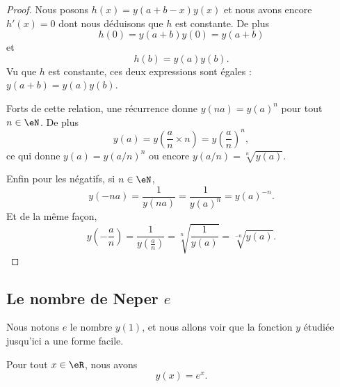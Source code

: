 \begin{proof}
    Nous posons \( h(x)=y(a+b-x)y(x)\) et nous avons encore \( h'(x)=0\) dont nous déduisons que $h$ est constante. De plus
    \begin{equation}
        h(0)=y(a+b)y(0)=y(a+b)
    \end{equation}
    et
    \begin{equation}
        h(b)=y(a)y(b).
    \end{equation}
    Vu que \( h\) est constante, ces deux expressions sont égales : \( y(a+b)=y(a)y(b)\).

    Forts de cette relation, une récurrence donne \( y(na)=y(a)^n\) pour tout \( n\in \eN\). De plus
    \begin{equation}
        y(a)=y\left( \frac{ a }{ n }\times n \right)=y\left( \frac{ a }{ n } \right)^n,
    \end{equation}
    ce qui donne \( y(a)=y(a/n)^n\) ou encore \( y(a/n)=\sqrt[n]{y(a)}\).

    Enfin pour les négatifs, si \( n\in \eN\),
    \begin{equation}
        y(-na)=\frac{1}{ y(na) }=\frac{1}{ y(a)^n }=y(a)^{-n}.
    \end{equation}
    Et de la même façon,
    \begin{equation}
        y\left( -\frac{ a }{ n } \right)=\frac{1}{ y\left( \frac{ a }{ n } \right) }=\sqrt[n]{\frac{1}{ y(a) }}=\sqrt[-n]{y(a)}.
    \end{equation}
\end{proof}

\subsection{Le nombre de Neper \( e\)}

Nous notons \( e\) le nombre \( y(1)\), et nous allons voir que la fonction \( y\) étudiée jusqu'ici a une forme facile.


\begin{proposition}     \label{PropCELWooLBSYmS}
    Pour tout \( x\in \eR\), nous avons
    \begin{equation}        \label{EQooBFIHooKopcmf}
        y(x)=e^x.
    \end{equation}
\end{proposition}

